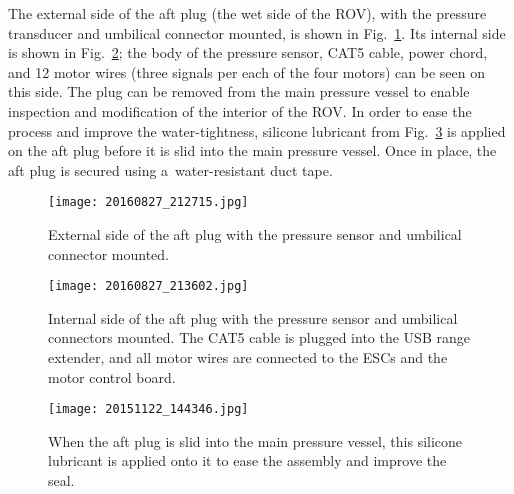 The external side of the aft plug (the wet side of the ROV), with the pressure transducer and umbilical connector mounted, is shown in Fig.~\ref{fig:externalSideOfTheAftPlug}. Its internal side is shown in Fig.~\ref{fig:internalSideOfTheAftPlug}; the body of the pressure sensor, CAT5 cable, power chord, and 12 motor wires (three signals per each of the four motors) can be seen on this side. The plug can be removed from the main pressure vessel to enable inspection and modification of the interior of the ROV. In order to ease the process and improve the water-tightness, silicone lubricant from Fig.~\ref{fig:lubricant} is applied on the aft plug before it is slid into the main pressure vessel. Once in place, the aft plug is secured using a~water-resistant duct tape.

\begin{figure}[htb]
\begin{minipage}[b]{1\linewidth}
  \centering
	\texttt{[image: 20160827\_212715.jpg]}
\end{minipage}
\caption{External side of the aft plug with the pressure sensor and umbilical connector mounted.}
\label{fig:externalSideOfTheAftPlug}
\end{figure}

\begin{figure}[htb]
\begin{minipage}[b]{1\linewidth}
  \centering
	\texttt{[image: 20160827\_213602.jpg]}
\end{minipage}
\caption{Internal side of the aft plug with the pressure sensor and umbilical connectors mounted. The CAT5 cable is plugged into the USB range extender, and all motor wires are connected to the ESCs and the motor control board.}
\label{fig:internalSideOfTheAftPlug}
\end{figure}

\begin{figure}[htb]
\begin{minipage}[b]{1\linewidth}
  \centering
	\texttt{[image: 20151122\_144346.jpg]}
\end{minipage}
\caption{When the aft plug is slid into the main pressure vessel, this silicone lubricant is applied onto it to ease the assembly and improve the seal.}
\label{fig:lubricant}
\end{figure}

